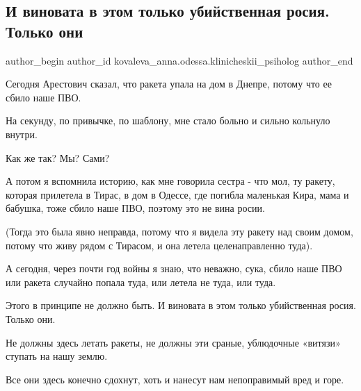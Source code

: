 
 
 
 
 

\subsection{И виновата в этом только убийственная росия. Только они}
\label{sec:14_01_2023.fb.kovaleva_anna.odessa.klinicheskii_psiholog.1.i_vinovata_v_etom_to}

\ifcmt
 author_begin
   author_id kovaleva_anna.odessa.klinicheskii_psiholog
 author_end
\fi

Сегодня Арестович сказал, что ракета упала на дом в Днепре, потому что ее сбило
наше ПВО.

На секунду, по привычке, по шаблону, мне стало больно и сильно кольнуло внутри.

Как же так? Мы? Сами?

А потом я вспомнила историю, как мне говорила сестра - что мол, ту ракету,
которая прилетела в Тирас, в дом в Одессе, где погибла маленькая Кира, мама и
бабушка, тоже сбило наше ПВО, поэтому это не вина росии.

(Тогда это была явно неправда, потому что я видела эту ракету над своим домом,
потому что живу рядом с Тирасом, и она летела целенаправленно туда).

А сегодня, через почти год войны я знаю, что неважно, сука, сбило наше ПВО или
ракета случайно попала туда, или летела не туда, или туда.

Этого в принципе не должно быть. И виновата в этом только убийственная росия.
Только они.

Не должны здесь летать ракеты, не должны эти сраные, ублюдочные «витязи»
ступать на нашу землю.

Все они здесь конечно сдохнут, хоть и нанесут нам непоправимый вред и горе.

